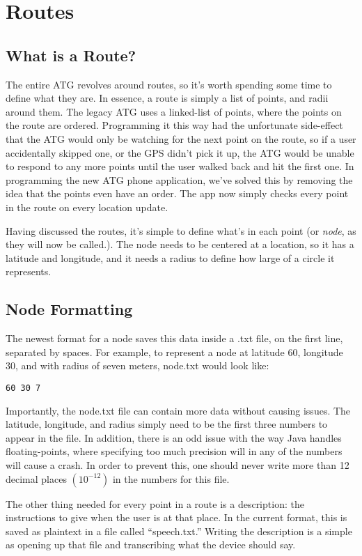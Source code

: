 \section{Routes}
\subsection{What is a Route?}
The entire ATG revolves around routes, so it's worth spending some time to define what they are. In essence, a route is simply a list of
points, and radii around them. The legacy ATG uses a linked-list of points, where the points on the route are ordered. Programming it this way
had the unfortunate side-effect that the ATG would only be watching for the next point on the route, so if a user accidentally skipped one,
or the GPS didn't pick it up, the ATG would be unable to respond to any more points until the user walked back and hit the first one.
In programming the new ATG phone application, we've solved this by removing the idea that the points even have an order. The app now simply
checks every point in the route on every location update.

Having discussed the routes, it's simple to define what's in each point (or \emph{node}, as they will now be called.). The node needs to be
centered at a location, so it has a latitude and longitude, and it needs a radius to define how large of a circle it represents.

\subsection{Node Formatting}
The newest format for a node saves this data inside a .txt file, on the first line, separated by spaces. For example, to represent a node at
latitude 60, longitude 30, and with radius of seven meters, node.txt would look like:
\begin{verbatim}
60 30 7
\end{verbatim}
Importantly, the node.txt file can contain more data without causing issues. The latitude, longitude, and radius simply need to be the first
three numbers to appear in the file. In addition, there is an odd issue with the way Java handles floating-points, where specifying too much
precision will in any of the numbers will cause a crash. In order to prevent this, one should never write more than 12 decimal places
$(10^{-12})$ in the numbers for this file.

The other thing needed for every point in a route is a description: the instructions to give when the user is at that place. In the current
format, this is saved as plaintext in a file called ``speech.txt.'' Writing the description is a simple as opening up that file and 
transcribing what the device should say.


